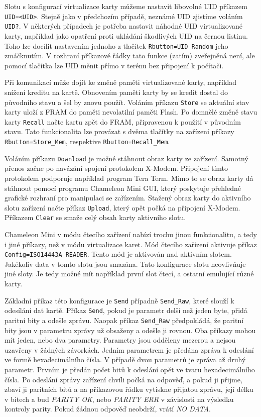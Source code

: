 Slotu s konfigurací virtualizace karty můžeme nastavit libovolné UID příkazem \verb|UID=<UID>|. Stejně jako v předchozím případě, neznámé UID zjistíme voláním \verb|UID?|. V některých případech je potřeba nastavit náhodné UID virtualizované karty, například jako opatření proti ukládání škodlivých UID na černou listinu. Toho lze docílit nastavením jednoho z tlačítek \verb|Rbutton=UID_Random| jeho zmáčknutím. V rozhraní příkazové řádky tato funkce (zatím) zveřejněná není, ale pomocí tlačítka lze UID měnit přímo v terénu bez připojení k počítači.\par
Při komunikací může dojít ke změně paměti virtualizované karty, například snížení kreditu na kartě. Obnovením paměti karty by se kredit dostal do původního stavu a šel by znovu použít. Voláním příkazu \verb|Store| se aktuální stav karty uloží z FRAM do paměti nevolatilní paměti Flash. Po domnělé změně stavu karty \verb|Recall| načte kartu zpět do FRAM, připravenou k použití v původním stavu. Tato funkcionalita lze provázat s dvěma tlačítky na zařízení příkazy \verb|Rbutton=Store_Mem|, respektive \verb|Rbutton=Recall_Mem|.\par
Voláním příkazu \verb|Download| je možné stáhnout obraz karty ze zařízení. Samotný přenos začne po navázání spojení protokolem {X-Modem}. Připojení tímto protokolem podporuje například program Tera Term. Mimo to se obraz karty dá stáhnout pomocí programu Chameleon Mini GUI\footnotemark, který poskytuje přehledné grafické rozhraní pro manipulaci se zařízením. Stažený obraz karty do aktivního slotu zařízení načte příkaz \verb|Upload|, který opět počká na připojení {X-Modem}. Příkazem \verb|Clear| se smaže celý obsah karty aktivního slotu.\par
{}
Chameleon Mini v módu čtecího zařízení nabízí trochu jinou funkcionalitu, a tedy i jiné příkazy, než v módu virtualizace karet. Mód čtecího zařízení aktivuje příkaz \verb|Config=ISO14443A_READER|. Tento mód je aktivován nad aktivním slotem. Jakékoliv data v tomto slotu jsou smazána. Tato konfigurace slotu neovlivňuje jiné sloty. Je tedy možné mít například první slot čtecí, a ostatní emulující různé karty. \par
Základní příkaz této konfigurace je \verb|Send| případně \verb|Send_Raw|, které slouží k odesílání dat kartě. Příkaz \verb|Send|, pokud je parametr delší než jeden byte, přidá paritní bity a odešle zprávu. Naopak příkaz \verb|Send_Raw| předpokládá, že paritní bity jsou v parametru zprávy už obsaženy a odešle ji rovnou. Oba příkazy mohou mít jeden, nebo dva parametry. Parametry jsou odděleny mezerou a nejsou uzavřeny v žádných závorkách. Jedním parametrem je předána zpráva k odeslání ve formě hexadecimálního čísla. V případě dvou parametrů je zpráva až druhý parametr. Prvním je předán počet bitů k odeslání opět ve tvaru hexadecimálního čísla. Po odeslání zprávy zařízení chvíli počká na odpověď, a pokud ji přijme, zbaví ji paritních bitů a na příkazovou řádku vytiskne přijatou zprávu, její délku v bitech a buď \emph{PARITY OK}, nebo \emph{PARITY ERR} v závislosti na výsledku kontroly parity. Pokud žádnou odpověď neobdrží, vrátí \emph{NO DATA}.\par
